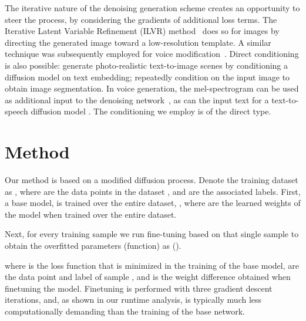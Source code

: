 \documentclass{article}
\theoremstyle{plain}
\begin{document}
The iterative nature of the denoising generation scheme creates an opportunity to steer the process, by considering the gradients of additional loss terms. The Iterative Latent Variable Refinement (ILVR) method~\citet{choi2021ilvr} does so for images by directing the generated image toward a low-resolution template. A similar technique was subsequently employed for voice modification~\citet{levkovitch2022zero}. Direct conditioning is also possible: \citet{imagen} generate photo-realistic text-to-image scenes by conditioning a diffusion model on text embedding;  \citet{amit2021segdiff} repeatedly condition on the input image to obtain image segmentation. In voice generation, the mel-spectrogram can be used as additional input to the denoising network~\citet{chen2020wavegrad,kong2021diffwave,liu2021diffsinger}, as can the input text for a text-to-speech diffusion model \citet{popov2021grad}. The conditioning we employ is of the direct type.





























\section{Method}
Our method is based on a modified diffusion process. 
Denote the training dataset as ,
where  are the data points in the dataset , and  are the associated labels. First, a base model,  is trained over the entire dataset, , where  are the learned weights of the model when trained over the entire dataset. 

Next, for every training sample  we run fine-tuning based on that single sample to obtain the overfitted parameters (function) as  (). 

where  is the loss function that is minimized in the training of the base model,  are the data point and label of sample , and  is the weight difference obtained when finetuning the model. Finetuning is performed with three gradient descent iterations, and,  as shown in our runtime analysis, is typically much less computationally demanding than the training of the base network.
\end{document}
